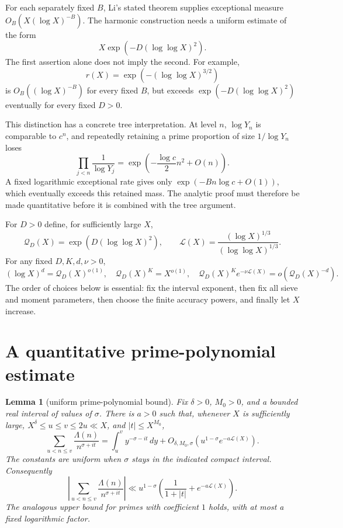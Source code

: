 \documentclass[11pt,a4paper]{article}
\newtheorem{lemma}[theorem]{Lemma}
\theoremstyle{remark}
\newcommand{\Q}{\mathcal Q}
\newcommand{\LL}{\mathcal L}
\begin{document}
For each separately fixed $B$, Li's stated theorem supplies exceptional
measure $O_B(X(\log X)^{-B})$.
The harmonic construction needs a uniform estimate of the form
\[
             X\exp(-D(\log\log X)^2).
\]
The first assertion alone does not imply the second.
For example,
\[
             r(X)=\exp(-(\log\log X)^{3/2})
\]
is $O_B((\log X)^{-B})$ for every fixed $B$, but exceeds
$\exp(-D(\log\log X)^2)$ eventually for every fixed $D>0$.

This distinction has a concrete tree interpretation.
At level $n$, $\log Y_n$ is comparable to $c^n$, and repeatedly retaining
a prime proportion of size $1/\log Y_n$ loses
\[
 \prod_{j<n}\frac1{\log Y_j}
       =\exp\left(-\frac{\log c}{2}n^2+O(n)\right).
\]
A fixed logarithmic exceptional rate gives only
$\exp(-Bn\log c+O(1))$, which eventually exceeds this retained mass.
The analytic proof must therefore be made quantitative before it is
combined with the tree argument.

For $D>0$ define, for sufficiently large $X$,
\[
 \Q_D(X)=\exp(D(\log\log X)^2),\qquad
 \LL(X)=\frac{(\log X)^{1/3}}{(\log\log X)^{1/3}}.
\]
For any fixed $D,K,d,\nu>0$,
\begin{equation}\label{eq:hierarchy}
 (\log X)^d=\Q_D(X)^{o(1)},\quad
 \Q_D(X)^K=X^{o(1)},\quad
 \Q_D(X)^K e^{-\nu\LL(X)}=o(\Q_D(X)^{-d}).
\end{equation}
The order of choices below is essential: fix the interval exponent,
then fix all sieve and moment parameters, then choose the finite
accuracy powers, and finally let $X$ increase.

\section{A quantitative prime-polynomial estimate}

\begin{lemma}[uniform prime-polynomial bound]\label{lem:vk}
Fix $\delta>0$, $M_0>0$, and a bounded real interval of values of $\sigma$.
There is $a>0$ such that, whenever $X$ is sufficiently large,
$X^\delta\le u\le v\le2u\ll X$, and $|t|\le X^{M_0}$,
\[
 \sum_{u<n\le v}\frac{\Lambda(n)}{n^{\sigma+it}}
   =\int_u^v y^{-\sigma-it}\,dy
     +O_{\delta,M_0,\sigma}\left(u^{1-\sigma}e^{-a\LL(X)}\right).
\]
The constants are uniform when $\sigma$ stays in the indicated compact
interval. Consequently
\[
 \left|\sum_{u<n\le v}\frac{\Lambda(n)}{n^{\sigma+it}}\right|
 \ll u^{1-\sigma}
       \left(\frac1{1+|t|}+e^{-a\LL(X)}\right).
\]
The analogous upper bound for primes with coefficient $1$ holds, with at
most a fixed logarithmic factor.
\end{lemma}
\end{document}
